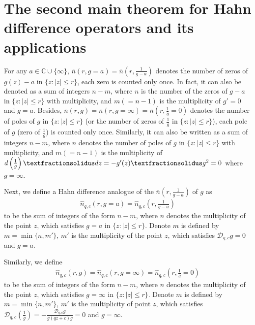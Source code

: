 \documentclass[sn-mathphys-num]{sn-jnl}%
\theoremstyle{thmstyleone}%
\theoremstyle{thmstyletwo}%
\theoremstyle{thmstylethree}%
\begin{document}
\section{The second main theorem for Hahn difference operators and its applications}
\indent For any $a\in\mathbb{C}\cup\{\infty\}$, $\overline{n}(r,g=a)=\overline{n}(r,\frac{1}{g-a})$ denotes the number of zeros of \(g(z)-a\) in \(\{z:|z|\leq r\}\), each zero is counted only once. In fact, it can also be denoted as a sum of integers $n-m$, where \(n\) is the number of the zeros of $g-a$ in $\{z:|z|\leq r\}$ with multiplicity, and $m(=n-1)$ is the multiplicity of $g'=0$ and $g=a$. Besides,  \(\overline{n}(r,g)=\overline{n}(r,g=\infty)=\overline{n}\left(r,\frac{1}{g}=0\right)\) denotes the number of poles of \(g\) in \(\{z:|z|\leq r\}\) (or the number of zeros of \(\frac{1}{g}\) in \(\{z:|z|\leq r\}\)), each pole of \(g\) (zero of \(\frac{1}{g}\)) is counted only once. Similarly, it can also be written as a sum of integers \(n-m\), where \(n\) denotes the number of poles of \(g\) in \(\{z:|z|\leq r\}\) with multiplicity, and \(m(=n-1)\) is the multiplicity of \(d\left(\frac{1}{g}\right)\textfractionsolidus dz=-g'(z)\textfractionsolidus g^{2}=0\) where \(g=\infty\).

\indent Next, we define a Hahn difference analogue of the $\overline{n}(r,\frac{1}{g-a})$ of $g$ as
\begin{align*}
	\hat{n}_{q,c}(r,g=a)=\hat{n}_{q,c}\left(r,\frac{1}{g-a}\right)
\end{align*}
to be the sum of integers of the form $n-m$, where \(n\) denotes the multiplicity of the point $z$, which satisfies $g=a$ in $\{z:|z|\leq r\}$. Denote $m$ is defined by $m=\min\{n,m'\}$, $m'$ is the multiplicity of the point \(z\), which satisfies $\mathcal{D}_{q,c}g=0$ and $g=a$.

Similarly, we define
\begin{align*}
	\hat{n}_{q,c}(r,g)=\hat{n}_{q,c}(r,g=\infty)=\hat{n}_{q,c}\left(r,\frac{1}{g}=0\right)
\end{align*}
to be the sum of integers of the form $n-m$, where \(n\) denotes the multiplicity of the point $z$, which satisfies $g=\infty$ in $\{z:|z|\leq r\}$. Denote $m$ is defined by $m=\min\{n,m'\}$, $m'$ is the multiplicity of point \(z\), which satisfies $\mathcal{D}_{q,c}\left(\frac{1}{g}\right)=-\frac{\mathcal{D}_{q,c}g}{g(qz+c)g}=0$ and \(g=\infty\).
\end{document}
